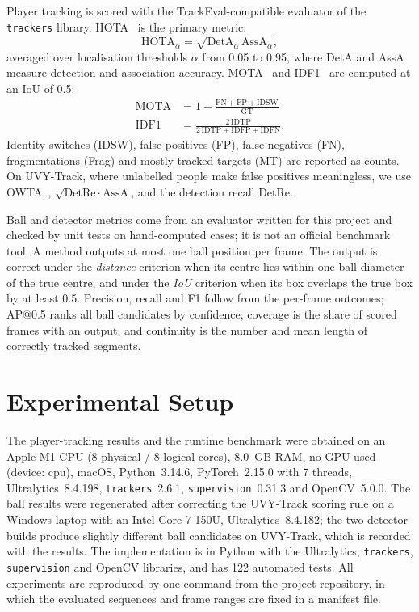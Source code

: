 \documentclass[conference]{IEEEtran}
\begin{document}
Player tracking is scored with the TrackEval-compatible evaluator of the
\texttt{trackers} library. HOTA~\cite{hota} is the primary metric:
\begin{equation}
\mathrm{HOTA}_{\alpha}=\sqrt{\mathrm{DetA}_{\alpha}\,\mathrm{AssA}_{\alpha}},
\label{eq:hota}
\end{equation}
averaged over localisation thresholds $\alpha$ from 0.05 to 0.95, where DetA and
AssA measure detection and association accuracy. MOTA~\cite{clear} and
IDF1~\cite{idf1} are computed at an IoU of 0.5:
\begin{equation}
\begin{aligned}
\mathrm{MOTA} &= 1-\frac{\mathrm{FN}+\mathrm{FP}+\mathrm{IDSW}}{\mathrm{GT}}\\
\mathrm{IDF1} &= \frac{2\,\mathrm{IDTP}}{2\,\mathrm{IDTP}+\mathrm{IDFP}+\mathrm{IDFN}}.
\end{aligned}
\label{eq:mota}
\end{equation}
Identity switches (IDSW), false positives (FP), false negatives (FN),
fragmentations (Frag) and mostly tracked targets (MT) are reported as counts. On
UVY-Track, where unlabelled people make false positives meaningless, we use
OWTA~\cite{owta}, $\sqrt{\mathrm{DetRe}\cdot\mathrm{AssA}}$, and the detection
recall DetRe.

Ball and detector metrics come from an evaluator written for this project and
checked by unit tests on hand-computed cases; it is not an official benchmark
tool. A method outputs at most one ball position per frame. The output is
correct under the \emph{distance} criterion when its centre lies within one ball
diameter of the true centre, and under the \emph{IoU} criterion when its box
overlaps the true box by at least 0.5. Precision, recall and F1 follow from the
per-frame outcomes; AP@0.5 ranks all ball candidates by confidence; coverage is
the share of scored frames with an output; and continuity is the number and
mean length of correctly tracked segments.

\section{Experimental Setup}
The player-tracking results and the runtime benchmark were obtained on an
Apple M1 CPU (8 physical / 8 logical cores), 8.0~GB RAM, no GPU used (device: cpu), macOS, Python~3.14.6, PyTorch~2.15.0 with 7 threads, Ultralytics~8.4.198, \texttt{trackers}~2.6.1, \texttt{supervision}~0.31.3 and OpenCV~5.0.0. The ball results were regenerated after correcting the UVY-Track
scoring rule on a Windows laptop with an Intel Core 7 150U, Ultralytics~8.4.182; the two detector builds
produce slightly different ball candidates on UVY-Track, which is recorded with
the results. The implementation is in Python with the Ultralytics, \texttt{trackers},
\texttt{supervision} and OpenCV libraries, and has 122 automated tests. All
experiments are reproduced by one command from the project repository, in which
the evaluated sequences and frame ranges are fixed in a manifest file.
\end{document}
